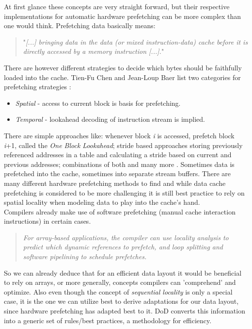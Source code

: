 At first glance these concepts are very straight forward, but their respective implementations for automatic hardware prefetching can be more complex than one would think. Prefetching data basically means:
\begin{quote}
"\textit{[...] bringing data in the data (or mixed instruction-data) cache before it is directly accessed by a memory instruction [...].}" 
\end{quote}
There are however different strategies to decide which bytes should be faithfully loaded into the cache. Tien-Fu Chen and Jean-Loup Baer list two categories for prefetching strategies :
\begin{itemize}
	\item \textit{Spatial} - access to current block is basis for prefetching.
	\item \textit{Temporal} - lookahead decoding of instruction stream is implied.
\end{itemize}
There are simple approaches like: whenever block \textit{i} is accessed, prefetch block \textit{i}+1, called the \textit{One Block Lookahead}; stride based approaches storing previously referenced addresses in a table and calculating a stride based on current and previous addresses; combinations of both and many more .  Sometimes data is prefetched into the cache, sometimes into separate stream buffers. There are many different hardware prefetching methods to find and while data cache prefetching is considered to be more challenging  it is still best practice to rely on spatial locality when modeling data to play into the cache's hand.\\
Compilers already make use of software prefetching (manual cache interaction instructions) in certain cases.
\begin{quote}
	\textit{For array-based applications, the compiler can use locality analysis to predict which dynamic references to prefetch, and loop splitting and software pipelining to schedule prefetches.} 
\end{quote}
So we can already deduce that for an efficient data layout it would be beneficial to rely on arrays, or more generally, concepts compilers can 'comprehend' and optimize. Also even though the concept of \textit{sequential locality} is only a special case, it is the one we can utilize best to derive adaptations for our data layout, since hardware prefetching has adapted best to it. DoD converts this information into a generic set of rules/best practices, a methodology for efficiency.


